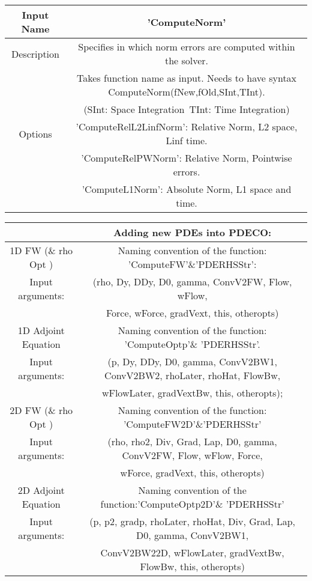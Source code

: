 \documentclass[11pt, a4paper]{article}
\theoremstyle{definition}
\begin{document}
   \begin{center}
	\begin{tabular}{ |c| c | }
		\hline
		Input Name & 'ComputeNorm' \\ 
		\hline
		Description & Specifies in which norm errors are computed within the solver. \\
		& Takes function name as input. Needs to have syntax ComputeNorm(fNew,fOld,SInt,TInt).\\ 
		&  (SInt: Space Integration\ TInt: Time Integration)\\
		\hline 
		Options & 'ComputeRelL2LinfNorm': Relative Norm, L2 space, Linf time.  \\
		& 'ComputeRelPWNorm': Relative Norm, Pointwise errors. \\
		& 'ComputeL1Norm': Absolute Norm, L1 space and time. \\
		\hline
	\end{tabular}
   \end{center}	


  \begin{center}
	\begin{tabular}{ |c| c | }
\hline
 & Adding new PDEs into PDECO: \\
 \hline
1D FW (\& rho Opt )& Naming convention of the function: 'ComputeFW'\&'PDERHSStr':\\ 
Input arguments:& (rho, Dy, DDy, D0, gamma, ConvV2FW, Flow, wFlow,\\
& Force, wForce, gradVext, this, otheropts) \\
\hline
1D Adjoint Equation & Naming convention of the function: 'ComputeOptp'\& 'PDERHSStr'. \\
Input arguments:& (p, Dy, DDy, D0, gamma, ConvV2BW1, ConvV2BW2, rhoLater, rhoHat, FlowBw,\\
& wFlowLater, gradVextBw, this, otheropts);
\\
\hline
2D FW (\& rho Opt ) & Naming convention of the function: 'ComputeFW2D'\&'PDERHSStr'\\
Input arguments: & (rho, rho2, Div, Grad, Lap, D0, gamma, ConvV2FW, Flow, wFlow, Force,\\ &wForce, gradVext, this, otheropts)\\
2D Adjoint Equation & Naming convention of the function:'ComputeOptp2D'\& 'PDERHSStr'\\
Input arguments:& (p, p2, gradp, rhoLater, rhoHat, Div, Grad, Lap, D0, gamma, ConvV2BW1,\\ &ConvV2BW22D,  wFlowLater, gradVextBw, FlowBw, this, otheropts)\\
\hline
	\end{tabular}
\end{center}	
\end{document}
